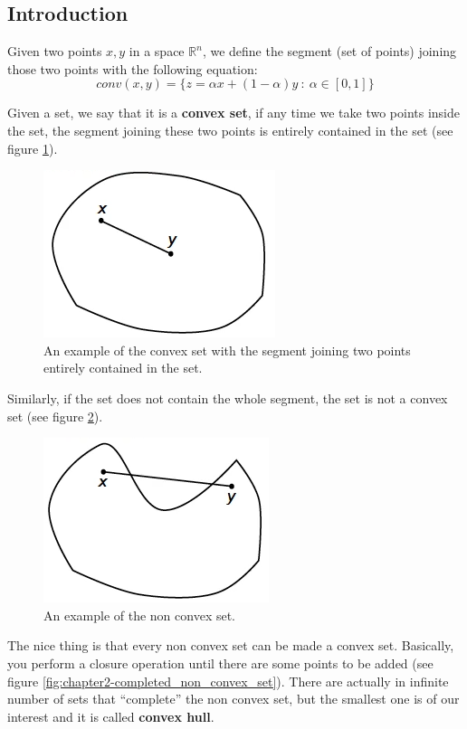 \subsection{Introduction}
\par Given two points $x,y$ in a space $\mathbb{R}^n$, we define the segment (set of points) joining those two points with the following equation:
\begin{equation}
    \textit{conv}(x,y) = \{z = \alpha x + (1-\alpha) y \ :\ \alpha \in [0,1]\}
\end{equation}
\par Given a set, we say that it is a \textbf{convex set}, if any time we take two points inside the set, the segment joining these two points is entirely contained in the set (see figure \ref{fig:chapter2-convex_set}).
\begin{figure}
    \centering
    \includegraphics[scale=0.4]{figures/2/chapter2-convex_set.png}
    \caption{An example of the convex set with the segment joining two points entirely contained in the set.}
    \label{fig:chapter2-convex_set}
\end{figure}
Similarly, if the set does not contain the whole segment, the set is not a convex set (see figure \ref{fig:chapter2-non_convex_set}).
\begin{figure}
    \centering
    \includegraphics[scale=0.4]{figures/2/chapter2-non_convex_set.png}
    \caption{An example of the non convex set.}
    \label{fig:chapter2-non_convex_set}
\end{figure}
\par The nice thing is that every non convex set can be made a convex set. Basically, you perform a closure operation until there are some points to be added (see figure \ref{fig:chapter2-completed_non_convex_set}). There are actually in infinite number of sets that ``complete'' the non convex set, but the smallest one is of our interest and it is called \textbf{convex hull}.
